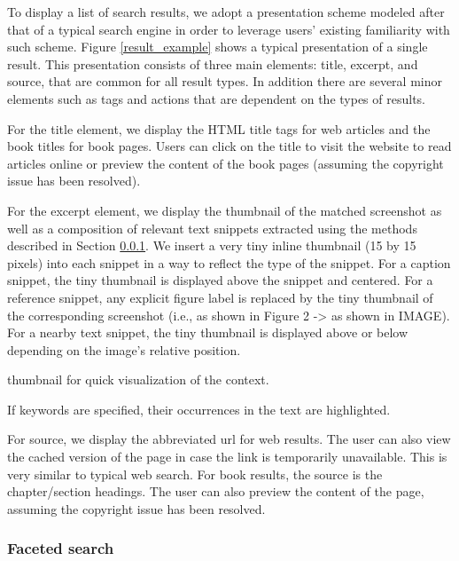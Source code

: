 \documentclass{www2010-submission}
\begin{document}

To display a list of search results, we adopt a presentation scheme 
modeled after that of a typical search engine in order to 
leverage users' existing familiarity with such scheme.  Figure
\ref{result_example} shows a typical presentation of a single
result. This presentation consists of three main elements: title,
excerpt, and source, that are common for all result types. In addition
there are several minor elements such as tags and actions that
are dependent on the types of results.

For the title element, we display the HTML title tags for web articles
and the book titles for book pages. Users can click on the title to
visit the website to read articles online or preview the content of
the book pages (assuming the copyright issue has been resolved).

For the excerpt element, we display the thumbnail of the matched
screenshot as well as a composition of relevant text snippets
extracted using the methods described in Section \ref{}. We insert a
very tiny inline thumbnail (15 by 15 pixels) into each snippet in a
way to reflect the type of the snippet. For a caption snippet, the
tiny thumbnail is displayed above the snippet and centered.  For a
reference snippet, any explicit figure label is replaced by the tiny
thumbnail of the corresponding screenshot (i.e., as shown in Figure 2
-> as shown in IMAGE). For a nearby text snippet, the tiny thumbnail
is displayed above or below depending on the image's relative
position.


thumbnail for quick visualization of the context. 

If keywords are
specified, their occurrences in the text are highlighted.

For source, we display the abbreviated url for web results. The
user can also view the cached version of the page in case the link
is temporarily unavailable. This is very similar to typical web
search. For book results, the source is the chapter/section
headings. The user can also preview the content of the page,
assuming the copyright issue has been resolved.

\subsubsection{Faceted search}
\end{document}
